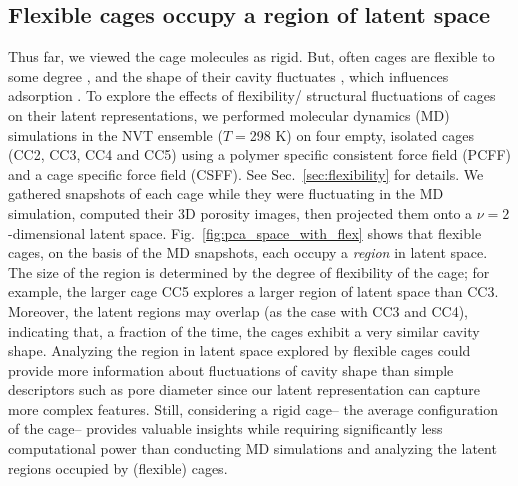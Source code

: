 \documentclass[journal=jacsat,manuscript=article,layout=traditional]{achemso}
\begin{document}
\subsection{\color{red} Flexible cages occupy a region of latent space}
{\color{red}Thus far, we viewed the cage molecules as rigid. But, often cages are flexible to some degree \cite{chen2014separation,camp2016transition,holden2014gas,holden2016understanding}, and the shape of their cavity fluctuates \cite{chen2014separation}, which influences adsorption \cite{witman2017influence}.
To explore the effects of flexibility/ structural fluctuations of cages on their latent representations, we performed molecular dynamics (MD) simulations in the NVT ensemble ($T=$298 K) on four empty, isolated cages (CC2, CC3, CC4 and CC5) using a polymer specific consistent force field (PCFF)\cite{sun1998compass} and a cage specific force field (CSFF)\cite{holden2012bespoke}. See Sec.~\ref{sec:flexibility} for details. We gathered snapshots of each cage while they were fluctuating in the MD simulation, computed their 3D porosity images, then projected them onto a $\nu=2$-dimensional latent space. Fig.~\ref{fig:pca_space_with_flex} shows that flexible cages, on the basis of the MD snapshots, each occupy a \emph{region} in latent space. The size of the region is determined by the degree of flexibility of the cage; for example, the larger cage CC5 explores a larger region of latent space than CC3. Moreover, the latent regions may overlap (as the case with CC3 and CC4), indicating that, a fraction of the time, the cages exhibit a very similar cavity shape. 
Analyzing the region in latent space explored by flexible cages could provide more information about fluctuations of cavity shape than simple descriptors such as pore diameter since our latent representation can capture more complex features. Still, considering a rigid cage-- the average configuration of the cage-- provides valuable insights while requiring significantly less computational power than conducting MD simulations and analyzing the latent regions occupied by (flexible) cages.
}
\end{document}
